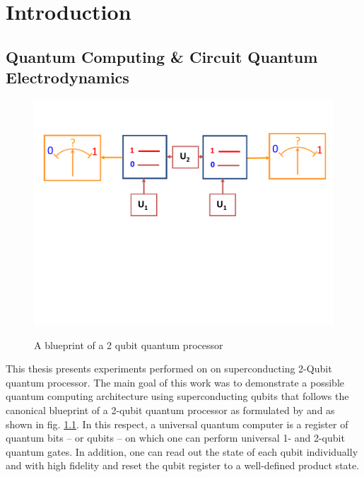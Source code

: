 \chapter{Introduction}


\section{Quantum Computing \& Circuit Quantum Electrodynamics}

\begin{figure}
	\centering
		\includegraphics[width=1.\textwidth]{./material/papers/grover/submission1/Fig1}
	\label{fig:Grover1}
	\caption{A blueprint of a 2 qubit quantum processor}
\end{figure}

This thesis presents experiments performed on on superconducting 2-Qubit quantum processor. The main goal of this work was to demonstrate a possible quantum computing architecture using superconducting qubits that follows the canonical blueprint of a 2-qubit quantum processor as formulated by \cite{divincenzo_physical_2000} and as shown in fig. \ref{fig:Grover1}. In this respect, a universal quantum computer is a register of quantum bits -- or qubits -- on which one can perform universal 1- and 2-qubit quantum gates. In addition, one can read out the state of each qubit individually and with high fidelity and reset the qubit register to a well-defined product state.

